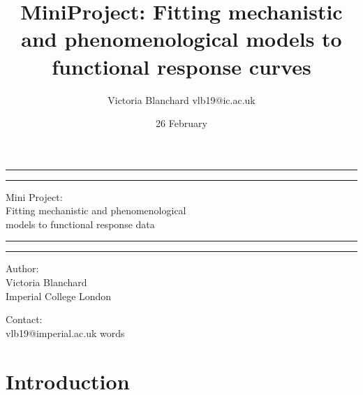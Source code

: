 \documentclass[11pt]{article}
\title {MiniProject: Fitting mechanistic and phenomenological models to functional response curves}
\author{Victoria Blanchard vlb19@ic.ac.uk}
\date{26 February}
\newcommand\wordcount{}
\begin{document}
	
	\begin{titlepage}
		
		
		\centering %
		
		
		
		
		\vspace*{5\baselineskip}
		
		\rule{\textwidth}{1.6pt}\vspace*{-\baselineskip}\vspace*{2pt} %
		\rule{\textwidth}{0.4pt} %
		
		\vspace{0.75\baselineskip} %
		
		{\LARGE Mini Project: \\ Fitting mechanistic and phenomenological \\ models to functional response data} 
		
		\vspace{0.75\baselineskip} %
		
		\rule{\textwidth}{0.4pt}\vspace*{-\baselineskip}\vspace{3.2pt} 
		\rule{\textwidth}{1.6pt} 
		
		\vspace{2\baselineskip} 
		
		
		Author: \\
		Victoria Blanchard \\
		Imperial College London
		
		\vspace{1.5 \baselineskip} %
		
		Contact: \\
		vlb19@imperial.ac.uk
		\mbox{}
		\vfill
		\wordcount words
		
	\end{titlepage}
	
	\linenumbers
	\doublespacing
	
	\section*{Introduction}
	
\end{document}
